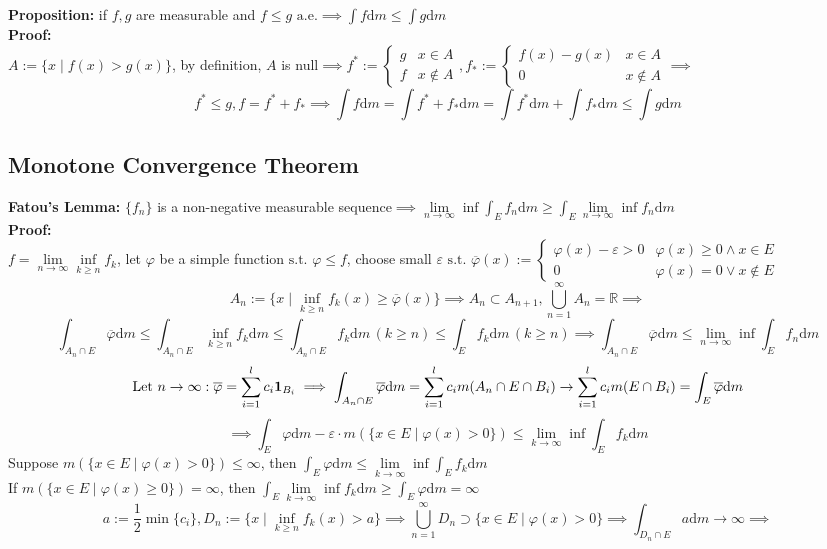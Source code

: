 \documentclass{article}
\newcommand{\R}{\mathbb{R}}
\newcommand{\cupninf}{\bigcup\limits_{n=1}^\infty}
\newcommand{\limninf}{\lim\limits_{n\to\infty}}
\newcommand{\limkinf}{\lim\limits_{k\to\infty}}
\newcommand{\st}{\mbox{ s.t. }}
\newcommand{\0}{{\bf{0}}}
\newcommand{\1}{{\bf{1}}}
\newcommand{\alev}{\mbox{ a.e.}}
\newcommand{\dint}{\displaystyle\int}
\newcommand{\dif}{\mbox{d}}
\begin{document}
\textbf{Proposition:} if $f,g$ are measurable and $f\le g\alev\implies\dint f\dif m\le\int g\dif m$\\
\textbf{Proof:}\\
$A:=\{x\mid f(x)>g(x)\}$, by definition, $A$ is null$\implies f^*:=\begin{cases}
    g&x\in A\\
    f&x\notin A
\end{cases},f_*:=\begin{cases}
    f(x)-g(x)&x\in A\\
    0&x\notin A
\end{cases}\implies$
$$f^*\le g,f=f^*+f_*\implies\int f\dif m=\int f^*+f_*\dif m=\int f^*\dif m+\int f_*\dif m\le\int g\dif m$$
\subsection{Monotone Convergence Theorem}
\textbf{Fatou's Lemma:} $\{f_n\}$ is a non-negative measurable sequence$\implies\limninf\displaystyle\inf\int_Ef_n\dif m\geq\dint_E\limninf\inf f_n\dif m$\\
\textbf{Proof:}\\
$f=\limninf\inf\limits_{k\geq n}f_k$, let $\varphi$ be a simple function$\st\varphi\le f$, choose small $\varepsilon\st\overline{\varphi}(x):=\begin{cases}
    \varphi(x)-\varepsilon>0&\varphi(x)\geq0\land x\in E\\
    0&\varphi(x)=0\lor x\notin E
\end{cases}$
$$A_n:=\{x\mid\inf_{k\geq n}f_k(x)\geq\overline{\varphi}(x)\}\implies A_n\subset A_{n+1},\cupninf A_n=\R\implies$$
$$\int_{A_n\cap E}\overline\varphi \dif m\le\int_{A_n\cap E}\inf_{k\geq n}f_k\dif m\le\int_{A_n\cap E}f_k\dif m\,(k\geq n)\le\int_Ef_k\dif m\,(k\geq n)\implies\int_{A_n\cap E}\overline\varphi \dif m\le\limninf\inf\int_E f_n\dif m$$
$$\mbox{Let }n\to\infty:\overline\varphi=\sum_{i=1}^lc_i\1_{B_i}\implies\int_{A_n\cap E}\overline\varphi \dif m=\sum_{i=1}^l c_im(A_n\cap E\cap B_i)\to\sum_{i=1}^lc_im(E\cap B_i)=\int_E\overline\varphi \dif m$$
$$\implies\int_E\varphi \dif m-\varepsilon\cdot m(\{x\in E\mid\varphi(x)>0\})\le\limkinf\inf\int_Ef_k\dif m$$
Suppose $m(\{x\in E\mid\varphi(x)>0\})\le\infty$, then $\dint_E\varphi \dif m\le\displaystyle\limkinf\inf\dint_Ef_k\dif m$\\
If $m(\{x\in E\mid\varphi(x)\geq0\})=\infty$, then $\dint_E \displaystyle\limkinf\inf f_k\dif m\geq\dint_E\varphi \dif m=\infty$
$$a:=\frac{1}{2}\min\{c_i\},D_n:=\{x\mid\inf_{k\geq n}f_k(x)>a\}\implies\cupninf D_n\supset\{x\in E\mid\varphi(x)>0\}\implies\int_{D_n\cap E}a\dif m\to\infty\implies$$
\end{document}
